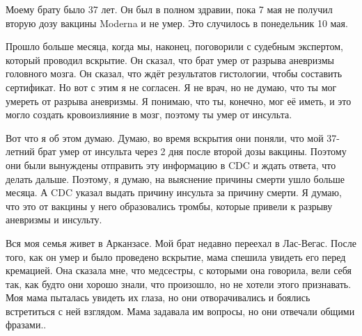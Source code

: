 Моему брату было 37 лет. Он был в полном здравии, пока 7 мая не получил вторую
дозу вакцины Moderna и не умер. Это случилось в понедельник 10 мая.

Прошло больше месяца, когда мы, наконец, поговорили с судебным экспертом,
который проводил вскрытие. Он сказал, что брат умер от разрыва аневризмы
головного мозга. Он сказал, что ждёт результатов гистологии, чтобы составить
сертификат. Но вот с этим я не согласен. Я не врач, но не думаю, что ты мог
умереть от разрыва аневризмы. Я понимаю, что ты, конечно, мог её иметь, и это
могло создать кровоизлияние в мозг, поэтому ты умер от инсульта.

Вот что я об этом думаю. Думаю, во время вскрытия они поняли, что мой 37-летний
брат умер от инсульта через 2 дня после второй дозы вакцины. Поэтому они были
вынуждены отправить эту информацию в CDC и ждать ответа, что делать
дальше. Поэтому, я думаю, на выяснение причины смерти ушло больше месяца. А CDC
указал выдать причину инсульта за причину смерти. Я думаю, что это от вакцины у
него образовались тромбы, которые привели к разрыву аневризмы и инсульту.

Вся моя семья живет в Арканзасе. Мой брат недавно переехал в Лас-Вегас. После
того, как он умер и было проведено вскрытие, мама спешила увидеть его перед
кремацией. Она сказала мне, что медсестры, с которыми она говорила, вели себя
так, как будто они хорошо знали, что произошло, но не хотели этого
признавать. Моя мама пыталась увидеть их глаза, но они отворачивались и боялись
встретиться с ней взглядом. Мама задавала им вопросы, но они отвечали общими
фразами..
